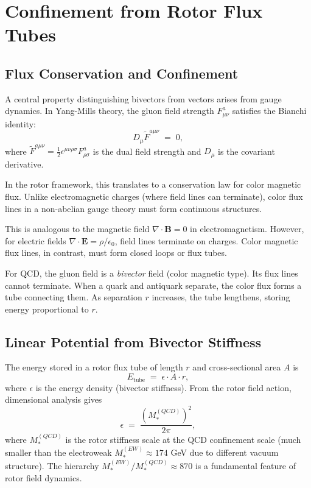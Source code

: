 \documentclass[11pt,a4paper]{article}
\theoremstyle{definition}
\theoremstyle{plain}
\theoremstyle{remark}
\begin{document}
\section{Confinement from Rotor Flux Tubes}
\label{sec:confinement}

\subsection{Flux Conservation and Confinement}

A central property distinguishing bivectors from vectors arises from gauge dynamics. In Yang-Mills theory, the gluon field strength $F_{\mu\nu}^a$ satisfies the Bianchi identity:
\begin{equation}
D_\mu \tilde{F}^{a\mu\nu} \;=\; 0,
\label{eq:bianchi-identity}
\end{equation}
where $\tilde{F}^{a\mu\nu} = \frac{1}{2}\epsilon^{\mu\nu\rho\sigma}F_{\rho\sigma}^a$ is the dual field strength and $D_\mu$ is the covariant derivative.

In the rotor framework, this translates to a conservation law for color magnetic flux. Unlike electromagnetic charges (where field lines can terminate), color flux lines in a non-abelian gauge theory must form continuous structures.

This is analogous to the magnetic field $\nabla \cdot \mathbf{B} = 0$ in electromagnetism. However, for electric fields $\nabla \cdot \mathbf{E} = \rho/\epsilon_0$, field lines terminate on charges. Color magnetic flux lines, in contrast, must form closed loops or flux tubes.

For QCD, the gluon field is a \emph{bivector} field (color magnetic type). Its flux lines cannot terminate. When a quark and antiquark separate, the color flux forms a tube connecting them. As separation $r$ increases, the tube lengthens, storing energy proportional to $r$.

\subsection{Linear Potential from Bivector Stiffness}

The energy stored in a rotor flux tube of length $r$ and cross-sectional area $A$ is
\begin{equation}
E_{\mathrm{tube}} \;=\; \epsilon \cdot A \cdot r,
\label{eq:tube-energy}
\end{equation}
where $\epsilon$ is the energy density (bivector stiffness). From the rotor field action, dimensional analysis gives
\begin{equation}
\epsilon \;=\; \frac{(M_*^{(QCD)})^2}{2\pi},
\end{equation}
where $M_*^{(QCD)}$ is the rotor stiffness scale at the QCD confinement scale (much smaller than the electroweak $M_*^{(EW)} \approx 174$ GeV due to different vacuum structure). The hierarchy $M_*^{(EW)}/M_*^{(QCD)} \approx 870$ is a fundamental feature of rotor field dynamics.
\end{document}
